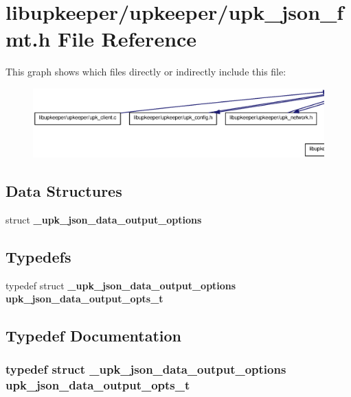 \section{libupkeeper/upkeeper/upk\_\-json\_\-fmt.h File Reference}
\label{upk__json__fmt_8h}
This graph shows which files directly or indirectly include this file:
\nopagebreak
\begin{figure}[H]
\begin{center}
\leavevmode
\includegraphics[width=400pt]{upk__json__fmt_8h__dep__incl}
\end{center}
\end{figure}
\subsection*{Data Structures}
\begin{DoxyCompactItemize}
\item 
struct {\bf \_\-upk\_\-json\_\-data\_\-output\_\-options}
\end{DoxyCompactItemize}
\subsection*{Typedefs}
\begin{DoxyCompactItemize}
\item 
typedef struct {\bf \_\-upk\_\-json\_\-data\_\-output\_\-options} {\bf upk\_\-json\_\-data\_\-output\_\-opts\_\-t}
\end{DoxyCompactItemize}


\subsection{Typedef Documentation}
\subsubsection[{upk\_\-json\_\-data\_\-output\_\-opts\_\-t}]{\setlength{\rightskip}{0pt plus 5cm}typedef struct {\bf \_\-upk\_\-json\_\-data\_\-output\_\-options}  {\bf upk\_\-json\_\-data\_\-output\_\-opts\_\-t}}\label{upk__json__fmt_8h_afa9f9642614352aa6be4a2a8745bfbe4}
